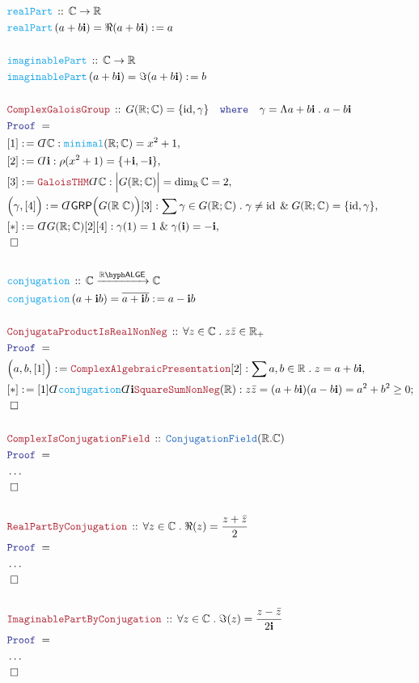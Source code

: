 \documentclass[12pt]{scrartcl}
\newcommand{\TYPE}[1]{\textcolor{NavyBlue}{\mathtt{#1}}}
\newcommand{\FUNC}[1]{\textcolor{Cerulean}{\mathtt{#1}}}
\newcommand{\LOGIC}[1]{\textcolor{Blue}{\mathtt{#1}}}
\newcommand{\THM}[1]{\textcolor{Maroon}{\mathtt{#1}}}
\renewcommand{\.}{\; . \;}
\newcommand{\de}{: \kern 0.1pc =}
\newcommand{\where}{\LOGIC{where}}
\newcommand{\Act}[1]{\left( #1 \right)}
\newcommand{\Theorem}[2]{& \THM{#1} \, :: \, #2 \\ & \Proof = \\ }
\newcommand{\DeclareFunc}[2]{& \FUNC{#1} \, :: \, #2 \\}
\newcommand{\DefineNamedFunc}[4]{&  \FUNC{#1}\Act{#2} = #3 \de #4 \\}
\newcommand{\Page}[1]{ \begin{align*} #1 \end{align*}   }
\newcommand{ \bd }{ \ByDef }
\newcommand{\NoProof}{ & \ldots \\ \EndProof}
\renewcommand{\And}{\; \& \;}
\newcommand{\Reals}{\mathbb{R} }
\newcommand{\Complex}{\mathbb{C}}
\DeclareMathOperator*{\id}{id}
\newcommand{\Arrow}{\xrightarrow}
\renewcommand{\i}{\mathbf{i}}
\newcommand{\Say}[3]{& #1 \de #2 : #3, \\}
\newcommand{\Conclude}[3]{& #1 \de #2 : #3; \\}
\newcommand{\QED}{\; \square}
\newcommand{\EndProof}{& \QED \\}
\newcommand{\ByDef}{\rotatebox[origin=c]{-180}{$D$}}%
\newcommand{\Proof}{\LOGIC{Proof} \; }
\newcommand{\GRP}{\mathsf{GRP}}
\newcommand{\LALGE}[1]{#1\hyph\mathsf{ALGE}}
\begin{document}
\Page{
	\DeclareFunc{realPart}{\Complex \to \Reals}
	\DefineNamedFunc{realPart}{a + b\i}{\Re(a + b\i)}{a}
	\\
	\DeclareFunc{imaginablePart}{\Complex \to \Reals}
	\DefineNamedFunc{imaginablePart}{a + b\i}{\Im(a + b\i)}{b}
	\\
	\Theorem{ComplexGaloisGroup}{G(\Reals;\Complex) = \{\id,\gamma\} 
		\quad \where \quad \gamma = \Lambda a + b\i \. a - b\i }
	\Say{[1]}{\bd \Complex}{\FUNC{minimal}(\Reals;\Complex) = x^2 + 1}
	\Say{[2]}{\bd \i }{\rho(x^2 + 1) = \{+\i,-\i\}}
	\Say{[3]}{\THM{GaloisTHM}\bd \Complex}{\Big| G(\Reals;\Complex)  \Big| = \dim_{\Reals} \Complex = 2}
	\Say{\Big(\gamma, [4] \Big)}{\bd \GRP\Big( G(\Reals\;\Complex) \Big) [3]}{\sum \gamma \in G(\Reals; \Complex)\. \gamma \neq \id \And  G(\Reals; \Complex) = \{\id,\gamma\}  }
	\Say{[*]}{\bd G(\Reals;\Complex) [2][4]}{\gamma(1) = 1 \And \gamma(\i) = -\i}
	\EndProof
	\\
	\DeclareFunc{conjugation}{\Complex \Arrow{\LALGE{\Reals}} \Complex}
	\DefineNamedFunc{conjugation}{a + \i b}{\overline{a + \i b}}{ a - \i b}
	\\
	\Theorem{ConjugataProductIsRealNonNeg}{\forall z \in \Complex \. z \bar  z \in \Reals_+}
	\Say{\Big(a,b, [1] \Big)}{\THM{ComplexAlgebraicPresentation}[2]}{\sum a,b \in \Reals \. z = a + b\i}
	\Conclude{[*]}{ [1] \bd \FUNC{conjugation} \bd \i \THM{SquareSumNonNeg}(\Reals)}{ z \bar z = (a + b\i)(a - b\i) = a^2 + b^2 \ge 0}
	\EndProof
	\\
	\Theorem{ComplexIsConjugationField}{\TYPE{ConjugationField}(\Reals.\Complex)}
	\NoProof
	\\
	\Theorem{RealPartByConjugation}{\forall z \in \Complex \. \Re(z) = \frac{z + \bar z}{2}}
	\NoProof
	\\
	\Theorem{ImaginablePartByConjugation}{\forall z \in \Complex \. \Im(z) = \frac{z - \bar z}{2 \i}}
	\NoProof
}
\newpage
\end{document}
